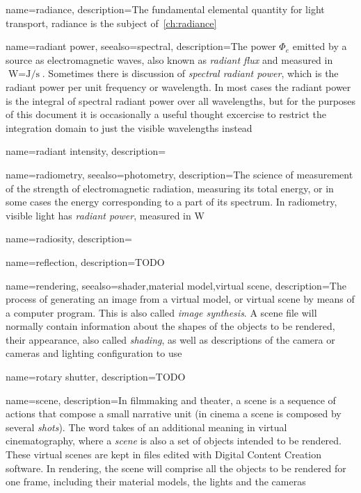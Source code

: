 {
	name=radiance,
	description={The fundamental elemental quantity for light transport, radiance
		is the subject of~\cref{ch:radiance}}
}

{
	name={radiant power},
	seealso={spectral},
	description={The power $\Phi_e$ emitted by a source as electromagnetic waves,
		also known as \textsl{radiant flux} and measured in 
		$\unit{\watt} = \unit{\joule\per\second}$. 
		Sometimes there is discussion of \textsl{spectral radiant power},
		which is the radiant power per unit frequency or wavelength.
		In most cases the radiant power is the integral of spectral radiant power
		over all wavelengths, but for the purposes of this document it is occasionally 
		a useful thought excercise to restrict the integration domain to just the
		visible wavelengths instead}
}

{
	name={radiant intensity},
	description=\nopostdesc
}

{
	name={radiometry},
	seealso={photometry},
	description={The science of measurement of the strength of electromagnetic radiation,
		measuring its total energy, or in some cases the energy corresponding to a part of
		its spectrum. In radiometry, visible light has \textsl{radiant power},
		measured in \unit{\watt}}
}

{
	name={radiosity},
	description=\nopostdesc
}

{
	name={reflection},
	description={TODO}
}

{
	name={rendering},
	seealso={shader,material model,virtual scene},
	description={The process of generating an image from a virtual model, or virtual scene by 
		means of a computer program. This is also called \textsl{image synthesis}. A scene file
		will normally contain information about the shapes of the objects to be rendered, their
		appearance, also called \textsl{shading}, as well as descriptions of the camera or cameras and lighting configuration
		to use}
}

{
	name={rotary shutter},
	description={TODO}
}

{
    name={scene},
	description={In filmmaking and theater, a scene is a sequence of actions that compose
		a small narrative unit (in cinema a scene is composed by several 
		\textsl{shots}). 
		The word takes of an additional meaning in virtual cinematography, 
		where a \textsl{scene} is also a set of objects intended to be rendered.
		These virtual scenes are kept in files edited with 
		Digital Content Creation software.
		In rendering, the scene will comprise all the objects to be rendered for one frame,
		including their material models, the lights and the cameras}
}

